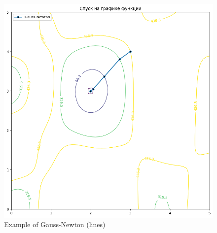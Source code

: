\documentclass[12pt, a4paper, oneside, final]{article}
\begin{document}
	\begin{figure}[H]
		\centering
		\includegraphics[scale = 0.55]{Image/T1_GAUSS_NEWTON_LINES_1.png}
		\caption*{Example of Gauss-Newton (lines)}
	\end{figure}
\end{document}
